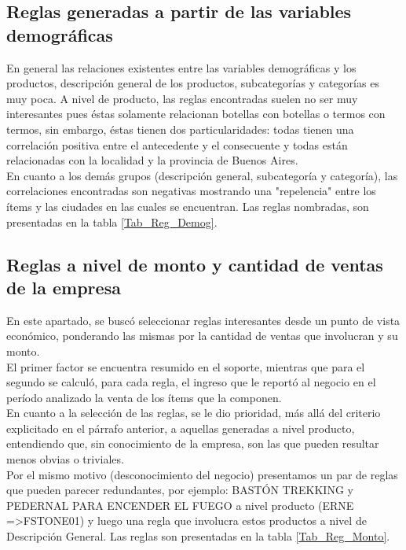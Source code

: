 \documentclass[]{article}
\begin{document}
	\subsection{Reglas generadas a partir de las variables demográficas}
	En general las relaciones existentes entre las variables demográficas y los productos, descripción general de los productos, subcategorías y categorías es muy poca. A nivel de producto, las reglas encontradas suelen no ser muy interesantes pues éstas solamente relacionan botellas con botellas o termos con termos, sin embargo, éstas tienen dos particularidades: todas tienen una correlación positiva entre el antecedente y el consecuente y todas están relacionadas con la localidad y la provincia de Buenos Aires.\\
	
	En cuanto a los demás grupos (descripción general, subcategoría y categoría), las correlaciones encontradas son negativas mostrando una "repelencia" entre los ítems y las ciudades en las cuales se encuentran. Las reglas nombradas, son presentadas en la tabla  \ref{Tab_Reg_Demog}.
	
	\subsection{Reglas a nivel de monto y cantidad de ventas de la empresa}
	
	En este apartado, se buscó seleccionar reglas interesantes desde un punto de vista económico, ponderando las mismas por la cantidad de ventas que involucran y su monto.\\
	
	El primer factor se encuentra resumido en el soporte, mientras que para el segundo se calculó, para cada regla, el ingreso que le reportó al negocio en el período analizado la venta de los ítems que la componen.\\
	
	En cuanto a la selección de las reglas, se le dio prioridad, más allá del criterio explicitado en el párrafo anterior, a aquellas generadas a nivel producto, entendiendo que, sin conocimiento de la empresa, son las que pueden resultar menos obvias o triviales.\\
	
	Por el mismo motivo (desconocimiento del negocio) presentamos un par de reglas que pueden parecer redundantes, por ejemplo: BASTÓN TREKKING y PEDERNAL PARA ENCENDER EL FUEGO a nivel producto ({ERNE} =\textgreater {FSTONE01}) y luego una regla que involucra estos productos a nivel de Descripción General. Las reglas son presentadas en la tabla \ref{Tab_Reg_Monto}.
	
\end{document}
